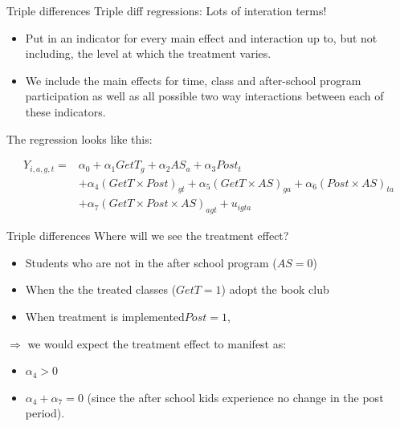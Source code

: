 \documentclass[
  ignorenonframetext,
]{beamer}
\begin{document}
\begin{frame}{Triple differences}
\protect\hypertarget{triple-differences}{}
Triple diff regressions: Lots of interation terms!

\begin{itemize}
\item
  Put in an indicator for every main effect and interaction up to, but
  not including, the level at which the treatment varies.
\item
  We include the main effects for time, class and after-school program
  participation as well as all possible two way interactions between
  each of these indicators.
\end{itemize}

The regression looks like this:

\[
\begin{aligned}
Y_{i,a,g,t}=&\alpha_0+\alpha_1 GetT_{g}+\alpha_2 AS_{a}+\alpha_3 Post_{t}\\
&+\alpha_4 (GetT \times Post)_{gt}+\alpha_5 (GetT \times AS)_{ga}+\alpha_6 (Post \times AS)_{ta}\\
&+\alpha_7 (GetT \times Post \times AS)_{agt}+u_{igta}
\end{aligned}
\]
\end{frame}

\begin{frame}{Triple differences}
\protect\hypertarget{triple-differences-1}{}
Where will we see the treatment effect?

\begin{itemize}
\item
  Students who are not in the after school program (\(AS=0\))
\item
  When the the treated classes (\(GetT=1\)) adopt the book club
\item
  When treatment is implemented\(Post=1\),
\end{itemize}

\(\Rightarrow\) we would expect the treatment effect to manifest as:

\begin{itemize}
\item
  \(\alpha_4>0\)
\item
  \(\alpha_4+\alpha_7=0\) (since the after school kids experience no
  change in the post period).
\end{itemize}
\end{frame}
\end{document}
